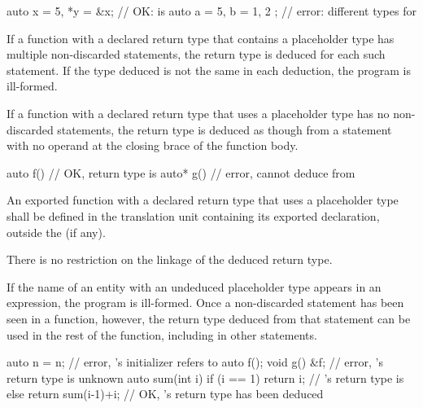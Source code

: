 \begin{example}
\begin{codeblock}
auto x = 5, *y = &x;            // OK:  is 
auto a = 5, b = { 1, 2 };       // error: different types for 
\end{codeblock}
\end{example}

\pnum
If a function with a declared return type that contains a placeholder type has
multiple non-discarded  statements, the return type is deduced for each
such  statement. If the type deduced is not the same in each
deduction, the program is ill-formed.

\pnum
If a function with a declared return type that uses a placeholder type has no
non-discarded  statements, the return type is deduced as though from a
 statement with no operand at the closing brace of the function
body.
\begin{example}
\begin{codeblock}
auto  f() { }                   // OK, return type is 
auto* g() { }                   // error, cannot deduce  from 
\end{codeblock}
\end{example}

\pnum
An exported function
with a declared return type that uses a placeholder type
shall be defined in the translation unit
containing its exported declaration,
outside the  (if any).
\begin{note}
There is no restriction on the linkage of
the deduced return type.
\end{note}

\pnum
If the name of an entity with an undeduced placeholder type appears in an
expression, the program is ill-formed.  Once a
non-discarded  statement has been seen in a function, however, the return type deduced
from that statement can be used in the rest of the function, including in other
 statements.
\begin{example}
\begin{codeblock}
auto n = n;                     // error, 's initializer refers to 
auto f();
void g() { &f; }                // error, 's return type is unknown
auto sum(int i) {
  if (i == 1)
    return i;                   // 's return type is 
  else
    return sum(i-1)+i;          // OK, 's return type has been deduced
}
\end{codeblock}
\end{example}

